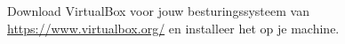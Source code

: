 Download VirtualBox voor jouw besturingssysteem van \url{https://www.virtualbox.org/} en installeer het op je machine.
